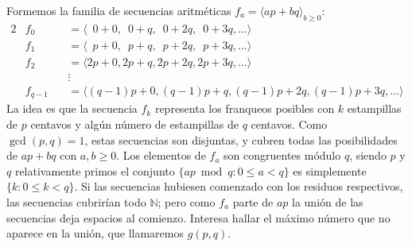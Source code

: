   Formemos la familia de secuencias aritméticas
  \(f_a = \langle a p + b q  \rangle_{b \ge 0}\):
  \begin{alignat*}{2}
    &f_0
      &\,&= \langle \phantom{0}0 + 0,
	       \phantom{p}0 + q,
	       \phantom{p}0 + 2 q,
	       \phantom{p}0 + 3 q, \dotsc \rangle \\
    &f_1
      &&= \langle \phantom{0}p + 0,
		  \phantom{0}p + q,
		  \phantom{0}p + 2 q,
		  \phantom{0}p + 3 q, \dotsc \rangle \\
    &f_2
      &&= \langle
	    2 p + 0, 2 p + q, 2 p + 2 q, 2 p + 3 q, \dotsc
	  \rangle \\
    & &&\vdots \\
    &f_{q - 1}
      &&= \langle
	    (q - 1) p + 0, (q - 1) p + q, (q - 1) p + 2 q,
	      (q - 1) p + 3 q, \dotsc
	  \rangle
  \end{alignat*}
  La idea es que la secuencia \(f_k\)
  representa los franqueos posibles
  con \(k\) estampillas de \(p\) centavos
  y algún número de estampillas de \(q\) centavos.
  Como \(\gcd(p, q) = 1\),
  estas secuencias son disjuntas,
  y cubren todas las posibilidades de \(a p + b q\)
  con \(a, b \ge 0\).
  Los elementos de \(f_a\) son congruentes módulo \(q\),
  siendo \(p\) y \(q\) relativamente primos
  el conjunto \(\{a p \bmod q \colon 0 \le a < q\}\)
  es simplemente \(\{k \colon 0 \le k < q\}\).
  Si las secuencias hubiesen comenzado
  con los residuos respectivos,
  las secuencias cubrirían todo \(\mathbb{N}\);
  pero como \(f_a\) parte de \(a p\)
  la unión de las secuencias deja espacios al comienzo.
  Interesa hallar el máximo número que no aparece en la unión,
  que llamaremos \(g(p, q)\).

